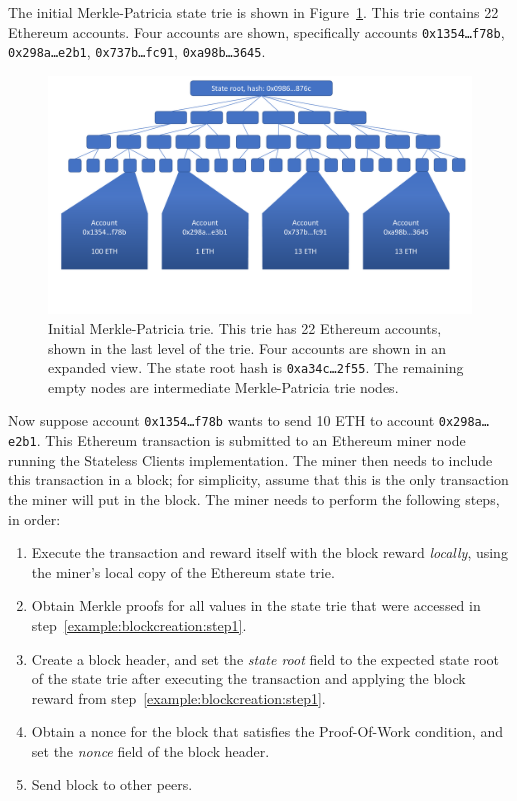 \documentclass[12pt]{article}
\newcommand{\System}{Stateless Clients\xspace}
\begin{document}
The initial Merkle-Patricia state trie is shown in Figure~\ref{fig:example:initial}. This trie contains 22 Ethereum accounts. Four accounts are shown, specifically accounts \texttt{0x1354\ldots f78b}, \texttt{0x298a\ldots e2b1}, \texttt{0x737b\ldots fc91}, \texttt{0xa98b\ldots 3645}.
\begin{figure}[H]
  \centering
  \includegraphics[width=\textwidth,page=1]{../figures/design/example.pdf}
  \caption{Initial Merkle-Patricia trie. This trie has 22 Ethereum accounts, shown in the last level of the trie. Four accounts are shown in an expanded view. The state root hash is \texttt{0xa34c\ldots 2f55}. The remaining empty nodes are intermediate Merkle-Patricia trie nodes.}
  \label{fig:example:initial}
\end{figure}

Now suppose account \texttt{0x1354\ldots f78b} wants to send 10 ETH to account \texttt{0x298a\ldots e2b1}. This Ethereum transaction is submitted to an Ethereum miner node running the \System implementation. The miner then needs to include this transaction in a block; for simplicity, assume that this is the only transaction the miner will put in the block. The miner needs to perform the following steps, in order:
\begin{enumerate}
  \item Execute the transaction and reward itself with the block reward \emph{locally}, using the miner's local copy of the Ethereum state trie. \label{example:blockcreation:step1}
  \item Obtain Merkle proofs for all values in the state trie that were accessed in step~\ref{example:blockcreation:step1}.
  \item Create a block header, and set the \emph{state root} field to the expected state root of the state trie after executing the transaction and applying the block reward from step~\ref{example:blockcreation:step1}.
  \item Obtain a nonce for the block that satisfies the Proof-Of-Work condition, and set the \emph{nonce} field of the block header.
  \item Send block to other peers.
\end{enumerate}
\end{document}
